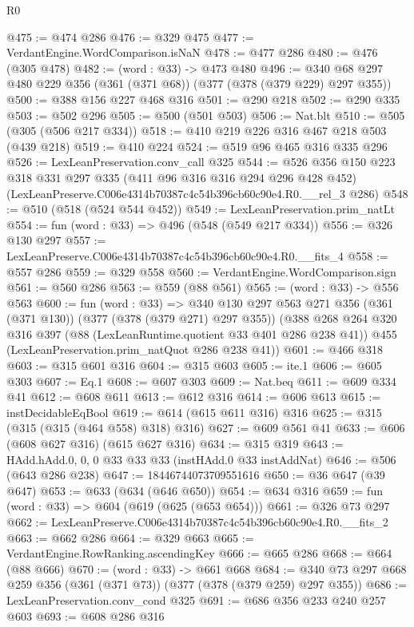 \begin{lexlean}{R0}
\begin{coremodule}
@475 := @474 @286
@476 := @329 @475
@477 := VerdantEngine.WordComparison.isNaN
@478 := @477 @286
@480 := @476 (@305 @478)
@482 := (word : @33) -> @473 @480
@496 := @340 @68 @297 @480 @229 @356 (@361 (@371 @68)) (@377 (@378 (@379 @229) @297 @355))
@500 := @388 @156 @227 @468 @316
@501 := @290 @218
@502 := @290 @335
@503 := @502 @296
@505 := @500 (@501 @503)
@506 := Nat.blt
@510 := @505 (@305 (@506 @217 @334))
@518 := @410 @219 @226 @316 @467 @218 @503 (@439 @218)
@519 := @410 @224
@524 := @519 @96 @465 @316 @335 @296
@526 := LexLeanPreservation.conv_call @325
@544 := @526
    @356
    @150
    @223
    @318
    @331
    @297
    @335
    (@411 @96 @316 @316 @294 @296 @428 @452)
    (LexLeanPreserve.C006e4314b70387c4c54b396cb60c90e4.R0.__rel_3 @286)
@548 := @510 (@518 (@524 @544 @452))
@549 := LexLeanPreservation.prim_natLt
@554 := fun (word : @33) => @496 (@548 (@549 @217 @334))
@556 := @326 @130 @297
@557 := LexLeanPreserve.C006e4314b70387c4c54b396cb60c90e4.R0.__fits_4
@558 := @557 @286
@559 := @329 @558
@560 := VerdantEngine.WordComparison.sign
@561 := @560 @286
@563 := @559 (@88 @561)
@565 := (word : @33) -> @556 @563
@600 := fun (word : @33) =>
  @340
    @130
    @297
    @563
    @271
    @356
    (@361 (@371 @130))
    (@377 (@378 (@379 @271) @297 @355))
    (@388
      @268
      @264
      @320
      @316
      @397
      (@88 (LexLeanRuntime.quotient @33 @401 @286 @238 @41))
      @455
      (LexLeanPreservation.prim_natQuot @286 @238 @41))
@601 := @466 @318
@603 := @315 @601 @316
@604 := @315 @603
@605 := ite.{1}
@606 := @605 @303
@607 := Eq.{1}
@608 := @607 @303
@609 := Nat.beq
@611 := @609 @334 @41
@612 := @608 @611
@613 := @612 @316
@614 := @606 @613
@615 := instDecidableEqBool
@619 := @614 (@615 @611 @316) @316
@625 := @315 (@315 (@315 (@464 @558) @318) @316)
@627 := @609 @561 @41
@633 := @606 (@608 @627 @316) (@615 @627 @316)
@634 := @315 @319
@643 := HAdd.hAdd.{0, 0, 0} @33 @33 @33 (instHAdd.{0} @33 instAddNat)
@646 := @506 (@643 @286 @238)
@647 := 18446744073709551616
@650 := @36 @647 (@39 @647)
@653 := @633 (@634 (@646 @650))
@654 := @634 @316
@659 := fun (word : @33) => @604 (@619 (@625 (@653 @654)))
@661 := @326 @73 @297
@662 := LexLeanPreserve.C006e4314b70387c4c54b396cb60c90e4.R0.__fits_2
@663 := @662 @286
@664 := @329 @663
@665 := VerdantEngine.RowRanking.ascendingKey
@666 := @665 @286
@668 := @664 (@88 @666)
@670 := (word : @33) -> @661 @668
@684 := @340 @73 @297 @668 @259 @356 (@361 (@371 @73)) (@377 (@378 (@379 @259) @297 @355))
@686 := LexLeanPreservation.conv_cond @325
@691 := @686 @356 @233 @240 @257 @603
@693 := @608 @286 @316

\end{coremodule}
\end{lexlean}
